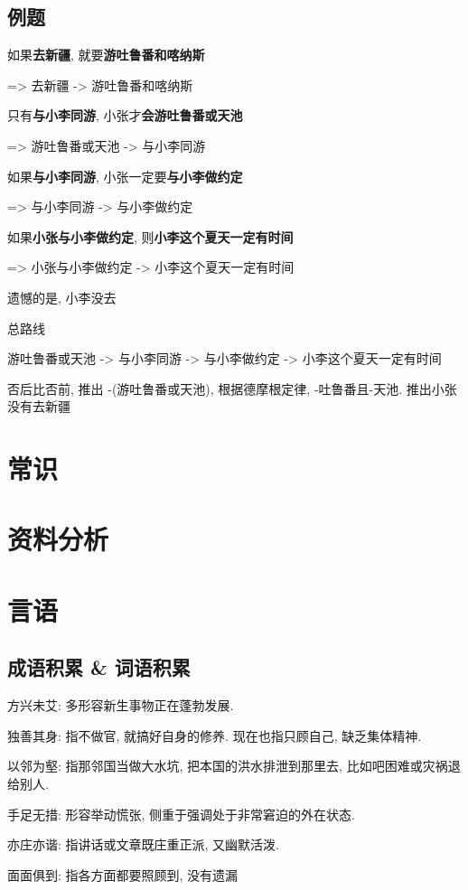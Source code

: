 \documentclass[UTF8]{ctexart}
\begin{document}
\subsection{例题}
如果\textbf{去新疆}, 就要\textbf{游吐鲁番和喀纳斯}

=> 去新疆 -> 游吐鲁番和喀纳斯

只有\textbf{与小李同游}, 小张才\textbf{会游吐鲁番或天池}

=> 游吐鲁番或天池 -> 与小李同游

如果\textbf{与小李同游}, 小张一定要\textbf{与小李做约定}

=> 与小李同游 -> 与小李做约定

如果\textbf{小张与小李做约定}, 则\textbf{小李这个夏天一定有时间}

=> 小张与小李做约定 -> 小李这个夏天一定有时间

遗憾的是, 小李没去

总路线

游吐鲁番或天池 -> 与小李同游 -> 与小李做约定 -> 小李这个夏天一定有时间

否后比否前, 推出 -(游吐鲁番或天池), 根据德摩根定律, -吐鲁番且-天池. 推出小张没有去新疆

\section{常识}


\section{资料分析}

\section{言语}

\subsection{成语积累 \& 词语积累}
方兴未艾: 多形容新生事物正在蓬勃发展.

独善其身: 指不做官, 就搞好自身的修养. 现在也指只顾自己, 缺乏集体精神.

以邻为壑: 指那邻国当做大水坑, 把本国的洪水排泄到那里去, 比如吧困难或灾祸退给别人.

手足无措: 形容举动慌张, 侧重于强调处于非常窘迫的外在状态.

亦庄亦谐: 指讲话或文章既庄重正派, 又幽默活泼.

面面俱到: 指各方面都要照顾到, 没有遗漏
\end{document}
